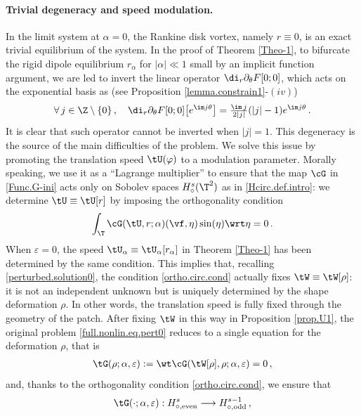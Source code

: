 \documentclass[a4paper,reqno,10pt]{article}
\newcommand{\pa}{\partial}
\begin{document}
\paragraph{Trivial degeneracy and speed modulation.}
In the limit system at $\alpha=0$, the Rankine disk vortex, namely $r\equiv 0$, is an exact trivial equilibrium of the system. In the proof of Theorem \ref{Theo-1}, to bifurcate the rigid dipole equilibrium $r_\alpha$ for $|\alpha|\ll 1$ small by an implicit function argument, we are led to invert the linear operator $\di_{r} \pa_{\theta} F[0;0]$, which acts on the exponential basis as (see Proposition \ref{lemma.constrain1}-$(iv)$)
\begin{equation}
   \forall\, j\in \Z\setminus\{0\}\,, \quad \di_{r} \pa_{\theta} F[0;0] \big[ e^{\im j \theta} \big] =  \tfrac{\im \,j}{2|j|} (|j|-1) e^{\im j \theta} \,.
\end{equation}
It is clear that such operator cannot be inverted when $|j|=1$. 
This degeneracy is the source of the main difficulties of the problem. 
We solve this issue by promoting the translation speed $\tU(\varphi)$ to a modulation parameter. Morally speaking, we use it as a ``Lagrange multiplier'' to ensure that the map $\cG$ in \eqref{Func.G-ini} acts only on Sobolev spaces $H_\circ^s(\T^2)$ as in \eqref{Hcirc.def.intro}: we determine $\tU \equiv \tU[r]$ by imposing the orthogonality condition
\begin{equation}\label{ortho.circ.cond}
    \int_\T \cG(\tU,r;\alpha)(\vf,\eta) \sin(\eta) \wrt\eta = 0 \,.
\end{equation}
When $\varepsilon=0$, the speed $\tU_{\alpha}\equiv \tU_{\alpha}[r_\alpha]$ in Theorem \ref{Theo-1} has been determined by the same condition. This implies that, recalling \eqref{perturbed.solution0}, the condition  \eqref{ortho.circ.cond} actually fixes $\tW\equiv \tW[\rho]$:
it is not an independent unknown but is uniquely determined by the shape 
deformation $\rho$. In other words, the translation speed is fully fixed 
through the geometry of the patch.
After fixing $\tW$ in this way in Proposition \ref{prop.U1}, the original problem \eqref{full.nonlin.eq.pert0} reduces to a single equation 
for the deformation $\rho$, that is
\begin{align}\label{equation.rho.full0intr}
\tG(\rho;\alpha,\varepsilon)
:=
\wt\cG(\tW[\rho],\rho;\alpha,\varepsilon)
=
0 \,,
\end{align}
and, thanks to the orthogonality condition \eqref{ortho.circ.cond}, we ensure that
\begin{equation}
    \tG(\cdot;\alpha,\varepsilon):
H^{s}_{\circ,\mathrm{even}}
\longrightarrow
H^{s-1}_{\circ,\mathrm{odd}} \,,
\end{equation}
\end{document}
